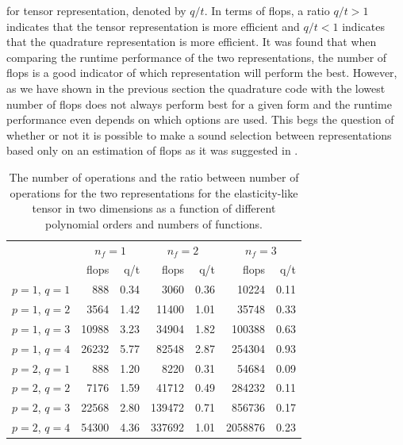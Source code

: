 for tensor representation, denoted by $q/t$.
In terms of flops, a ratio $q/t > 1$ indicates that the tensor representation is
more efficient and $q/t < 1$ indicates that the quadrature representation is
more efficient.
It was found that when comparing the runtime performance of the two
representations, the number of flops is a good indicator of which
representation will perform the best.
However, as we have shown in the previous section the quadrature code with the
lowest number of flops does not always perform best for a given form and
the runtime performance even depends on which  options are used.
This begs the question of whether or not it is possible to make a sound
selection between representations based only on an estimation of flops as
it was suggested in \citet{oelgaard:2010}.
%
\begin{table}
\caption{The number of operations and the ratio between number of operations
         for the two representations for the elasticity-like tensor in two
         dimensions as a function of different polynomial orders and numbers of
         functions.}
\label{oelgaard-2:tab:elasticity2D_complex_comparison}
\begin{center}\small
\begin{tabular}{l|rr|rr|rr}
\multicolumn{1}{c}{} & \multicolumn{2}{c}{$n_f = 1$} & \multicolumn{2}{c}{$n_f = 2$} & \multicolumn{2}{c}{$n_f = 3$}\\
                  & flops & q/t          & flops & q/t          & flops & q/t\\
\hline
$p = 1$, $q = 1$  &    888  &  0.34               &    3060 &  0.36               &   10224 & 0.11\\
$p = 1$, $q = 2$  &   3564  &  1.42               &   11400 &  1.01               &   35748 & 0.33\\
$p = 1$, $q = 3$  &  10988  &  3.23               &   34904 &  1.82               &  100388 & 0.63\\
$p = 1$, $q = 4$  &  26232  &  5.77               &   82548 &  2.87               &  254304 & 0.93\\
\hline
$p = 2$, $q = 1$  &    888  &  1.20               &    8220 &  0.31               &   54684 & 0.09\\
$p = 2$, $q = 2$  &   7176  &  1.59               &   41712 &  0.49               &  284232 & 0.11\\
$p = 2$, $q = 3$  &  22568  &  2.80               &  139472 &  0.71               &  856736 & 0.17\\
$p = 2$, $q = 4$  &  54300  &  4.36               &  337692 &  1.01               & 2058876 & 0.23\\

\end{tabular}
\end{center}
\end{table}
